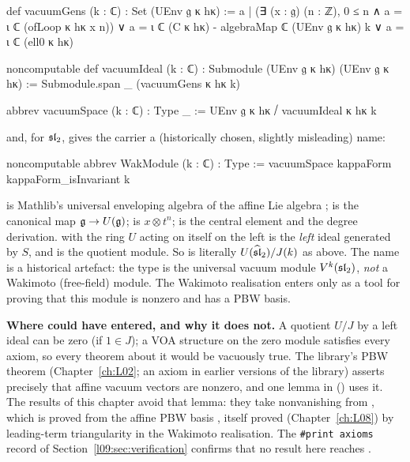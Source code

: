\begin{leancode}
def vacuumGens (k : ℂ) : Set (UEnv 𝔤 κ hκ) :=
  {a | (∃ (x : 𝔤) (n : ℤ), 0 ≤ n ∧ a = ι ℂ (ofLoop κ hκ x n))
        ∨ a = ι ℂ (C κ hκ) - algebraMap ℂ (UEnv 𝔤 κ hκ) k
        ∨ a = ι ℂ (ell0 κ hκ)}
\end{leancode}
\begin{leancode}
noncomputable def vacuumIdeal (k : ℂ) : Submodule (UEnv 𝔤 κ hκ) (UEnv 𝔤 κ hκ) :=
  Submodule.span _ (vacuumGens κ hκ k)
\end{leancode}
\begin{leancode}
abbrev vacuumSpace (k : ℂ) : Type _ := UEnv 𝔤 κ hκ ⧸ vacuumIdeal κ hκ k
\end{leancode}
and, for $\mathfrak{sl}_2$, gives the carrier a (historically chosen, slightly misleading) name:
\begin{leancode}
noncomputable abbrev WakModule (k : ℂ) : Type :=
  vacuumSpace kappaForm kappaForm_isInvariant k
\end{leancode}

\begin{dictionary}
 is Mathlib's universal enveloping algebra of the affine Lie algebra
;  is the canonical map $\mathfrak{g}\to U(\mathfrak{g})$;
 is $x\otimes t^n$;  is the central element and  the
degree derivation.  with the ring $U$ acting on itself on the left is the
\emph{left} ideal generated by $S$, and  is the quotient module. So  is
literally $U(\widehat{\mathfrak{sl}}_2)/J(k)$ as above. The name  is a historical artefact: the
type is the universal vacuum module $V^k(\mathfrak{sl}_2)$, \emph{not} a Wakimoto (free-field) module. The
Wakimoto realisation enters only as a tool for proving that this module is nonzero and has a PBW
basis.
\end{dictionary}

\begin{warning}
\textbf{Where  could have entered, and why it does not.} A quotient $U/J$ by a left
ideal can be zero (if $1\in J$); a VOA structure on the zero module satisfies every axiom, so
every theorem about it would be vacuously true. The library's PBW theorem
 (Chapter~\ref{ch:L02}; an axiom in earlier versions of the library) asserts precisely that affine vacuum vectors are nonzero, and
one lemma in  () uses it.
The results of this chapter avoid that lemma: they take nonvanishing from
, which is proved from the affine PBW
basis , itself proved (Chapter~\ref{ch:L08}) by
leading-term triangularity in the Wakimoto realisation. The \texttt{\#print axioms} record of
Section~\ref{l09:sec:verification} confirms that no result here reaches .
\end{warning}

